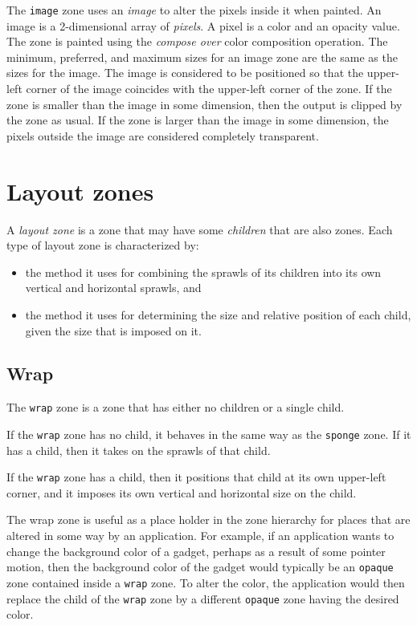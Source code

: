 \documentclass{report}
\def\code#1{\texttt{#1}}
\begin{document}
The \code{image} zone uses an \emph{image} to alter the pixels inside
it when painted.  An image is a 2-dimensional array of \emph{pixels}.
A pixel is a color and an opacity value.  The zone is painted using
the \emph{compose over} color composition operation.  The minimum,
preferred, and maximum sizes for an image zone are the same as the
sizes for the image.  The image is considered to be positioned so that
the upper-left corner of the image coincides with the upper-left
corner of the zone.  If the zone is smaller than the image in some
dimension, then the output is clipped by the zone as usual.  If the
zone is larger than the image in some dimension, the pixels outside
the image are considered completely transparent.

\section{Layout zones}
\label{sec-zones-layout}

A \emph{layout zone} is a zone that may have some \emph{children} that
are also zones.  Each type of layout zone is characterized by:

\begin{itemize}
\item the method it uses for combining the sprawls of its children
  into its own vertical and horizontal sprawls, and
\item the method it uses for determining the size and relative
  position of each child, given the size that is imposed on it. 
\end{itemize}

\subsection{Wrap}
\label{sec-zones-layout-wrap}

The \code{wrap} zone is a zone that has either no children or a single
child.  

If the \code{wrap} zone has no child, it behaves in the same way as
the \code{sponge} zone.  If it has a
child, then it takes on the sprawls of that child.

If the \code{wrap} zone has a child, then it positions that child at
its own upper-left corner, and it imposes its own vertical and
horizontal size on the child.

The wrap zone is useful as a place holder in the zone hierarchy for
places that are altered in some way by an application.  For example,
if an application wants to change the background color of a gadget,
perhaps as a result of some pointer motion, then the background color
of the gadget would typically be an \code{opaque} zone
 contained inside a \code{wrap}
zone.  To alter the color, the application would then replace the
child of the \code{wrap} zone by a different \code{opaque} zone having
the desired color.
\end{document}

